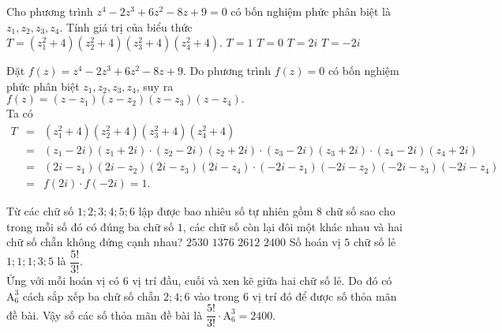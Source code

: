 \begin{ex}%
	Cho phương trình $z^4-2z^3+6z^2-8z+9=0$ có bốn nghiệm phức phân biệt là $z_1, z_2, z_3, z_4$. Tính giá trị của biểu thức $T = \left( z_1^2+4 \right)\left( z_2^2+4 \right)\left( z_3^2+4 \right)\left( z_4^2+4 \right).$
	\choice
	{\True $T=1$}
	{$T=0$}
	{$T=2i$}
	{$T=-2i$}
	\loigiai
	{Đặt $f(z)=z^4-2z^3+6z^2-8z+9$. Do phương trình $f(z)=0$ có bốn nghiệm phức phân biệt  $z_1, z_2, z_3, z_4$, suy ra $f(z)= (z-z_1)(z-z_2)(z-z_3)(z-z_4).$\\
	Ta có 
	\begin{eqnarray*}
		T &=& \left( z_1^2+4 \right)\left( z_2^2+4 \right)\left( z_3^2+4 \right)\left( z_4^2+4 \right)\\
		&= & (z_1-2i)(z_1+2i)\cdot (z_2-2i)(z_2+2i) \cdot (z_3-2i)(z_3+2i) \cdot(z_4-2i)(z_4+2i)\\
		&=& (2i-z_1)(2i-z_2)(2i-z_3)(2i-z_4)\cdot (-2i-z_1)(-2i-z_2)(-2i-z_3)(-2i-z_4)\\
		&= & f(2i) \cdot f(-2i) =1.
	\end{eqnarray*}
		
	}
\end{ex}

\begin{ex}%
	Từ các chữ số $1;2;3;4;5;6$ lập được bao nhiêu số tự nhiên gồm $8$ chữ số sao cho trong mỗi số đó có đúng ba chữ số $1$, các chữ số còn lại đôi một khác nhau và hai chữ số chẵn không đứng cạnh nhau?
	\choice
	{$2530$}
	{$1376$}
	{$2612$}
	{\True $2400$}
	\loigiai
	{ Số hoán vị $5$ chữ số lẻ $1;1;1;3;5$ là $\dfrac{5!}{3!}.$\\
		Ứng với mỗi hoán vị có $6$ vị trí đầu, cuối và xen kẽ giữa hai chữ số lẻ. Do đó có $\mathrm{A}_6^3$ cách sắp xếp ba chữ số chẵn $2;4;6$ vào trong $6$ vị trí đó để được số thỏa mãn đề bài. Vậy số các số thỏa mãn đề bài là $\dfrac{5!}{3!}\cdot \mathrm{A}_6^3=2400.$
	}
\end{ex}


